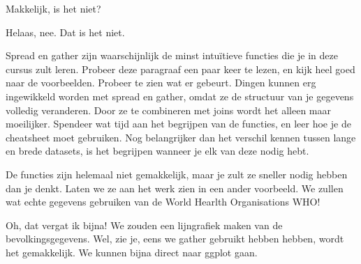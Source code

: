 \documentclass[]{tufte-book}
\newenvironment{Shaded}{}{}
\newcommand{\DataTypeTok}[1]{\textcolor[rgb]{0.56,0.13,0.00}{#1}}
\newcommand{\DecValTok}[1]{\textcolor[rgb]{0.25,0.63,0.44}{#1}}
\newcommand{\KeywordTok}[1]{\textcolor[rgb]{0.00,0.44,0.13}{\textbf{#1}}}
\newcommand{\NormalTok}[1]{#1}
\newcommand{\OperatorTok}[1]{\textcolor[rgb]{0.40,0.40,0.40}{#1}}
\newcommand{\StringTok}[1]{\textcolor[rgb]{0.25,0.44,0.63}{#1}}
\begin{document}
Makkelijk, is het niet?

Helaas, nee. Dat is het niet.

Spread en gather zijn waarschijnlijk de minst intuïtieve functies die je in deze cursus zult leren. Probeer deze paragraaf een paar keer te lezen, en kijk heel goed naar de voorbeelden. Probeer te zien wat er gebeurt. Dingen kunnen erg ingewikkeld worden met spread en gather, omdat ze de structuur van je gegevens volledig veranderen. Door ze te combineren met joins wordt het alleen maar moeilijker. Spendeer wat tijd aan het begrijpen van de functies, en leer hoe je de cheatsheet moet gebruiken. Nog belangrijker dan het verschil kennen tussen lange en brede datasets, is het begrijpen wanneer je elk van deze nodig hebt.

De functies zijn helemaal niet gemakkelijk, maar je zult ze sneller nodig hebben dan je denkt. Laten we ze aan het werk zien in een ander voorbeeld. We zullen wat echte gegevens gebruiken van de World Hearlth Organisations WHO!

Oh, dat vergat ik bijna! We zouden een lijngrafiek maken van de bevolkingsgegevens. Wel, zie je, eens we gather gebruikt hebben hebben, wordt het gemakkelijk. We kunnen bijna direct naar ggplot gaan.

\begin{Shaded}
\end{Shaded}
\end{document}
